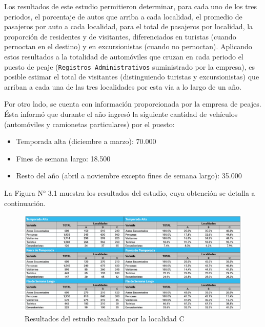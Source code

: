 \documentclass[
]{book}
\begin{document}
Los resultados de este estudio permitieron determinar, para cada uno de los tres periodos, el porcentaje de autos que arriba a cada localidad, el promedio de pasajeros por auto a cada localidad, para el total de pasajeros por localidad, la proporción de residentes y de visitantes, diferenciados en turistas (cuando pernoctan en el destino) y en excursionistas (cuando no pernoctan). Aplicando estos resultados a la totalidad de automóviles que cruzan en cada periodo el puesto de peaje (\texttt{Registros\ Administrativos} suministrado por la empresa), es posible estimar el total de visitantes (distinguiendo turistas y excursionistas) que arriban a cada una de las tres localidades por esta vía a lo largo de un año.

Por otro lado, se cuenta con información proporcionada por la empresa de peajes. Ésta informó que durante el año ingresó la siguiente cantidad de vehículos (automóviles y camionetas particulares) por el puesto:

\begin{itemize}
\item
  Temporada alta (diciembre a marzo): 70.000
\item
  Fines de semana largo: 18.500
\item
  Resto del año (abril a noviembre excepto fines de semana largo): 35.000
\end{itemize}

La Figura N° 3.1 muestra los resultados del estudio, cuya obtención se detalla a continuación.

\begin{figure}

{\centering \includegraphics[width=1\linewidth]{imagenes/figura04} 

}

\caption{Resultados del estudio realizado por la localidad C}\label{fig:estudioslocalidade}
\end{figure}
\end{document}
